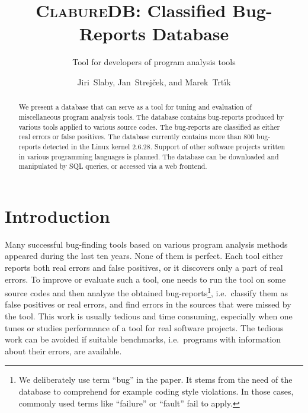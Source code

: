 \documentclass[10pt]{llncs}
\newcommand\cdb{\textsc{ClabureDB}\xspace}
\begin{document}

\title{\cdb: Classified Bug-Reports Database}
\subtitle{Tool for developers of program analysis tools}
\author{Jiri~Slaby, Jan~Strej\v{c}ek, and Marek~Trt\'{\i}k}

\maketitle

\begin{abstract}
  We present a database that can serve as a tool for tuning and evaluation
  of miscellaneous program analysis tools. The database contains bug-reports
  produced by various tools applied to various source codes. The bug-reports
  are classified as either real errors or false positives. The database
  currently contains more than 800 bug-reports detected in the Linux kernel
  2.6.28. Support of other software projects written in various programming
  languages is planned. The database can be downloaded and manipulated by
  SQL queries, or accessed via a web frontend.
\end{abstract}



\section{Introduction}
\label{sec:introduction}

Many successful bug-finding tools based on various program analysis methods
appeared during the last ten years. None of them is perfect. Each tool
either reports both real errors and false positives, or it discovers only a
part of real errors. To improve or evaluate such a tool, one needs to run
the tool on some source codes and then analyze the obtained
bug-reports\footnote{We deliberately use term ``bug'' in the paper. It stems
from the need of the database to comprehend for example coding style
violations. In those cases, commonly used terms like ``failure'' or ``fault''
fail to apply.}, i.e.~classify them as false positives or real errors, and
find errors in the sources that were missed by the tool. This work is usually
tedious and time consuming, especially when one tunes or studies performance
of a tool for real software projects. The tedious work can be avoided if
suitable benchmarks, i.e.~programs with information about their errors, are
available.
\end{document}
